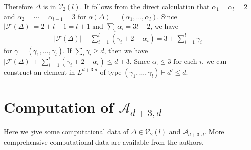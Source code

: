 \documentclass{wstmp}
\begin{document}
\begin{remark}
Therefore $\Delta$ is in ${\mathcal{V}}_2(l)$.
It follows from the direct calculation that
$\alpha_1=\alpha_l=2$ and $\alpha_2=\cdots=\alpha_{l-1}=3$
for $\alpha(\Delta)=(\alpha_1,\ldots,\alpha_l)$.
Since ${\left|{{\mathcal{F}}(\Delta)}\right|}=2+l-1=l+1$ and $\sum_i \alpha_i =3l-2$,
we have
\begin{align*}
{\left|{{\mathcal{F}}(\Delta)}\right|}+\sum_{i=1}^{l} (\gamma_i+2-\alpha_i)
=3+\sum_{i=1}^{l}\gamma_i
\end{align*}
for 
$\gamma=(\gamma_1,\ldots,\gamma_l)$.
If  $\sum_i \gamma_i \geq d$,
then we have ${\left|{{\mathcal{F}}(\Delta)}\right|}+\sum_{i=1}^{l} (\gamma_i+2-\alpha_i) \leq d+3$.
Since $\alpha_i \leq 3$ for each $i$,
we can construct
an element in $L^{d+3,d}$
of type $(\gamma_1,\ldots,\gamma_l){\vdash} d' \leq d$. 
\end{remark}

\section{Computation of ${\mathcal{A}}_{d+3,d}$}
\label{sec:computation:disc}
Here we give some computational data of  
$\Delta \in {\mathcal{V}}_2(l)$ and ${\mathcal{A}}_{d+3,d}$.
More comprehensive computational data are available from the authors.
\end{document}
